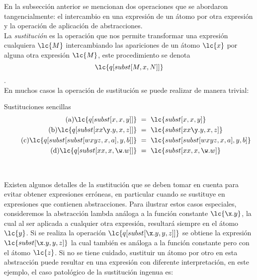 En la subsección anterior se mencionan dos operaciones que se abordaron tangencialmente: el intercambio en una expresión de un átomo por otra expresión y la operación de aplicación de abstracciones. \\

La \emph{sustitución} es la operación que nos permite transformar una expresión cualquiera \(\lc{M}\) intercambiando las apariciones de un átomo \(\lc{x}\) por alguna otra expresión \(\lc{M}\), este procedimiento se denota \\
\[\lc{q[subst[M,x,N]]}\]. \\

En muchos casos la operación de sustitución se puede realizar de manera trivial: \\

\begin{ejemplo} Sustituciones sencillas
  \label{ejemplo:sustitucion1}
  \begin{subequations}
    \begin{align}
      \label{ejemplo:sustitucion1:a} \tag{a}
      \lc{q[subst[x,x,y]]}\ &=\ \lc{subst[x,x,y]}
      \\
      \label{ejemplo:sustitucion1:b} \tag{b}
      \lc{q[subst[x x \y.y,x,z]]}\ &=\ \lc{subst[x x \y.y,x,z]}
      \\
      \label{ejemplo:sustitucion1:c} \tag{c}
      \lc{q[subst[subst[w x y z,x,a],y,b]]}\ &=\ \lc{subst[subst[w x y z,x,a],y,b]}
      \\
      \label{ejemplo:sustitucion1:d} \tag{d}
      \lc{q[subst[x x,x,\w.w]]}\ &=\ \lc{subst[x x,x,\w.w]}
    \end{align}
  \end{subequations}
\end{ejemplo} \

Existen algunos detalles de la sustitución que se deben tomar en cuenta para evitar obtener expresiones erróneas, en particular cuando se sustituye en expresiones que contienen abstracciones. Para ilustrar estos casos especiales, consideremos la abstracción lambda análoga a la función constante \(\lc{\x.y}\), la cual al ser aplicada a cualquier otra expresión, resultará siempre en el átomo \(\lc{y}\). Si se realiza la operación \(\lc{q[subst[\x.y,y,z]]}\) se obtiene la expresión \(\lc{subst[\x.y,y,z]}\) la cual también es análoga a la función constante pero con el átomo \(\lc{z}\). Si no se tiene cuidado, sustituir un átomo por otro en esta abstracción puede resultar en una expresión con diferente interpretación, en este ejemplo, el caso patológico de la sustitución ingenua es: \\


